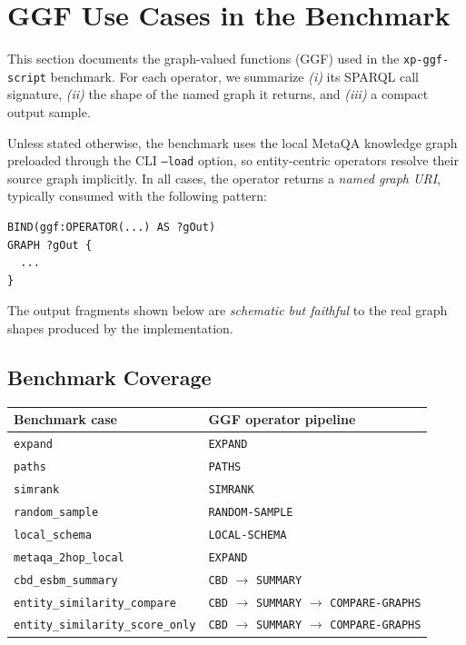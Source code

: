 \section{GGF Use Cases in the Benchmark}
\label{sec:ggf-use-cases}

This section documents the graph-valued functions (GGF) used in the
\texttt{xp-ggf-script} benchmark. For each operator, we summarize
\emph{(i)} its SPARQL call signature,
\emph{(ii)} the shape of the named graph it returns, and
\emph{(iii)} a compact output sample.

Unless stated otherwise, the benchmark uses the local MetaQA knowledge graph
preloaded through the CLI \texttt{--load} option, so entity-centric operators
resolve their source graph implicitly. In all cases, the operator returns a
\emph{named graph URI}, typically consumed with the following pattern:

\begin{verbatim}
BIND(ggf:OPERATOR(...) AS ?gOut)
GRAPH ?gOut {
  ...
}
\end{verbatim}

The output fragments shown below are \emph{schematic but faithful} to the real
graph shapes produced by the implementation.

\subsection{Benchmark Coverage}
\label{subsec:ggf-benchmark-coverage}

\begin{center}
\small
\begin{tabular}{l|l}
\hline
Benchmark case & GGF operator pipeline \\
\hline
\texttt{expand} & \texttt{EXPAND} \\
\texttt{paths} & \texttt{PATHS} \\
\texttt{simrank} & \texttt{SIMRANK} \\
\texttt{random\_sample} & \texttt{RANDOM-SAMPLE} \\
\texttt{local\_schema} & \texttt{LOCAL-SCHEMA} \\
\texttt{metaqa\_2hop\_local} & \texttt{EXPAND} \\
\texttt{cbd\_esbm\_summary} & \texttt{CBD} $\rightarrow$ \texttt{SUMMARY} \\
\texttt{entity\_similarity\_compare} & \texttt{CBD} $\rightarrow$ \texttt{SUMMARY} $\rightarrow$ \texttt{COMPARE-GRAPHS} \\
\texttt{entity\_similarity\_score\_only} & \texttt{CBD} $\rightarrow$ \texttt{SUMMARY} $\rightarrow$ \texttt{COMPARE-GRAPHS} \\
\hline
\end{tabular}
\end{center}

